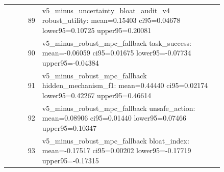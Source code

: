 \documentclass{article}
\begin{document}
\begin{center}
\begin{longtable}{rp{0.84\linewidth}}
89 & v5\_minus\_uncertainty\_bloat\_audit\_v4 robust\_utility: mean=0.15403 ci95=0.04678 lower95=0.10725 upper95=0.20081\\
90 & v5\_minus\_robust\_mpc\_fallback task\_success: mean=-0.06059 ci95=0.01675 lower95=-0.07734 upper95=-0.04384\\
91 & v5\_minus\_robust\_mpc\_fallback hidden\_mechanism\_f1: mean=0.44440 ci95=0.02174 lower95=0.42267 upper95=0.46614\\
92 & v5\_minus\_robust\_mpc\_fallback unsafe\_action: mean=0.08906 ci95=0.01440 lower95=0.07466 upper95=0.10347\\
93 & v5\_minus\_robust\_mpc\_fallback bloat\_index: mean=-0.17517 ci95=0.00202 lower95=-0.17719 upper95=-0.17315\\
\bottomrule
\end{longtable}
\normalsize
\end{center}

\nocite{*}




\end{document}
